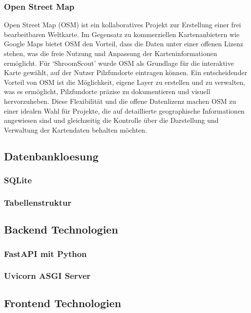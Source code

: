 \documentclass[../main.tex]{subfiles} %
\begin{document}
\subsubsection{Open Street Map}

Open Street Map (OSM) ist ein kollaboratives Projekt zur Erstellung einer frei bearbeitbaren Weltkarte. Im Gegensatz zu kommerziellen
Kartenanbietern wie Google Maps bietet OSM den Vorteil, dass die Daten unter einer offenen Lizenz stehen, was die freie Nutzung und
Anpassung der Karteninformationen ermöglicht. Für `ShroomScout' wurde OSM als Grundlage für die interaktive Karte gewählt, auf der Nutzer
Pilzfundorte eintragen können. Ein entscheidender Vorteil von OSM ist die Möglichkeit, eigene Layer zu erstellen und zu verwalten, was es
ermöglicht, Pilzfundorte präzise zu dokumentieren und visuell hervorzuheben. Diese Flexibilität und die offene Datenlizenz machen OSM zu
einer idealen Wahl für Projekte, die auf detaillierte geographische Informationen angewiesen sind und gleichzeitig die Kontrolle über die
Darstellung und Verwaltung der Kartendaten behalten möchten.

\subsection{Datenbankloesung} %

\subsubsection{SQLite}

\subsubsection{Tabellenstruktur}

\subsection{Backend Technologien} %

\subsubsection{FastAPI mit Python}

\subsubsection{Uvicorn ASGI Server}

\subsection{Frontend Technologien} %
\end{document}
